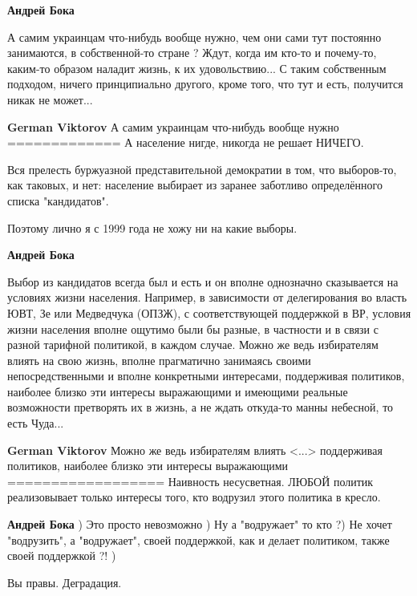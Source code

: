 \begin{itemize}
\begin{itemize}
\textbf{Андрей Бока} 

А самим украинцам что-нибудь вообще нужно, чем они сами тут постоянно
занимаются, в собственной-то стране ? Ждут, когда им кто-то и почему-то,
каким-то образом наладит жизнь, к их удовольствию... С таким собственным
подходом, ничего принципиально другого, кроме того, что тут и есть, получится
никак не может...


\textbf{German Viktorov} А самим украинцам что-нибудь вообще нужно
=============
А население нигде, никогда не решает НИЧЕГО.

Вся прелесть буржуазной представительной демократии в том, что выборов-то, как
таковых, и нет: население выбирает из заранее заботливо определённого списка
"кандидатов".

Поэтому лично я с 1999 года не хожу ни на какие выборы.

\textbf{Андрей Бока} 

Выбор из кандидатов всегда был и есть и он вполне однозначно сказывается на
условиях жизни населения. Например, в зависимости от делегирования во власть
ЮВТ, Зе или Медведчука (ОПЗЖ), с соответствующей поддержкой в ВР, условия жизни
населения вполне ощутимо были бы разные, в частности и в связи с разной
тарифной политикой, в каждом случае. Можно же ведь избирателям влиять на свою
жизнь, вполне прагматично занимаясь своими непосредственными и вполне
конкретными интересами, поддерживая политиков, наиболее близко эти интересы
выражающими и имеющими реальные возможности претворять их в жизнь, а не ждать
откуда-то манны небесной, то есть Чуда...

\textbf{German Viktorov} Можно же ведь избирателям влиять <...> поддерживая политиков, наиболее близко эти интересы выражающими
==================
Наивность несусветная.
ЛЮБОЙ политик реализовывает только интересы того, кто водрузил этого политика в кресло.

\textbf{Андрей Бока} ) Это просто невозможно ) Ну а "водружает" то кто ?) Не хочет "водрузить", а "водружает", своей поддержкой, как и делает политиком, также своей поддержкой ?! )

\end{itemize} %

Вы правы. Деградация.

\end{itemize} %
